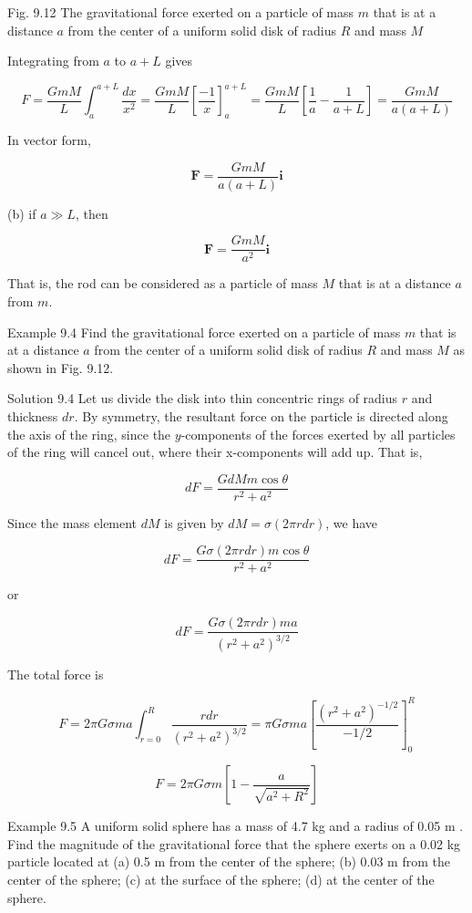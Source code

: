 \documentclass[10pt]{article}
\begin{document}
Fig. 9.12 The gravitational force exerted on a particle of mass $m$ that is at a distance $a$ from the center of a uniform solid disk of radius $R$ and mass $M$

Integrating from $a$ to $a+L$ gives

$$
F=\frac{G m M}{L} \int_{a}^{a+L} \frac{d x}{x^{2}}=\frac{G m M}{L}\left[\frac{-1}{x}\right]_{a}^{a+L}=\frac{G m M}{L}\left[\frac{1}{a}-\frac{1}{a+L}\right]=\frac{G m M}{a(a+L)}
$$

In vector form,

$$
\mathbf{F}=\frac{G m M}{a(a+L)} \mathbf{i}
$$

(b) if $a \gg L$, then

$$
\mathbf{F}=\frac{G m M}{a^{2}} \mathbf{i}
$$

That is, the rod can be considered as a particle of mass $M$ that is at a distance $a$ from $m$.

Example 9.4 Find the gravitational force exerted on a particle of mass $m$ that is at a distance $a$ from the center of a uniform solid disk of radius $R$ and mass $M$ as shown in Fig. 9.12.

Solution 9.4 Let us divide the disk into thin concentric rings of radius $r$ and thickness $d r$. By symmetry, the resultant force on the particle is directed along the axis of the ring, since the $y$-components of the forces exerted by all particles of the ring will cancel out, where their x-components will add up. That is,

$$
d F=\frac{G d M m \cos \theta}{r^{2}+a^{2}}
$$

Since the mass element $d M$ is given by $d M=\sigma(2 \pi r d r)$, we have

$$
d F=\frac{G \sigma(2 \pi r d r) m \cos \theta}{r^{2}+a^{2}}
$$

or

$$
d F=\frac{G \sigma(2 \pi r d r) m a}{\left(r^{2}+a^{2}\right)^{3 / 2}}
$$

The total force is

$$
F=2 \pi G \sigma m a \int_{r=0}^{R} \frac{r d r}{\left(r^{2}+a^{2}\right)^{3 / 2}}=\pi G \sigma m a\left[\frac{\left(r^{2}+a^{2}\right)^{-1 / 2}}{-1 / 2}\right]_{0}^{R}
$$

$$
F=2 \pi G \sigma m\left[1-\frac{a}{\sqrt{a^{2}+R^{2}}}\right]
$$

Example 9.5 A uniform solid sphere has a mass of 4.7 kg and a radius of 0.05 m . Find the magnitude of the gravitational force that the sphere exerts on a 0.02 kg particle located at (a) 0.5 m from the center of the sphere; (b) 0.03 m from the center of the sphere; (c) at the surface of the sphere; (d) at the center of the sphere.
\end{document}
